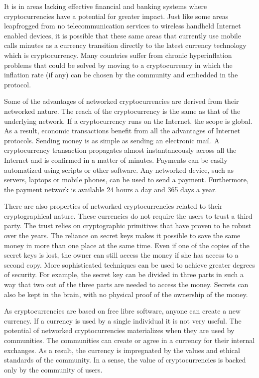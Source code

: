 \documentclass[journal]{IEEEtran}
\begin{document}
It is in areas lacking effective financial and banking systems where cryptocurrencies have a potential for greater impact.
Just like some areas leapfrogged from no telecommunication services to wireless handheld Internet enabled devices, it is possible that these same areas that currently use mobile calls minutes as a currency transition directly to the latest currency technology which is cryptocurrency.
Many countries suffer from chronic hyperinflation problems that could be solved by moving to a cryptocurrency in which the inflation rate (if any) can be chosen by the community and embedded in the protocol.

Some of the advantages of networked cryptocurrencies are derived from their networked nature.
The reach of the cryptocurrency is the same as that of the underlying network.
If a cryptocurrency runs on the Internet, the scope is global.
As a result, economic transactions benefit from all the advantages of Internet protocols.
Sending money is as simple as sending an electronic mail.
A cryptocurrency transaction propagates almost instantaneously across all the Internet and is confirmed in a matter of minutes.
Payments can be easily automatized using scripts or other software.
Any networked device, such as servers, laptops or mobile phones, can be used to send a payment.
Furthermore, the payment network is available 24 hours a day and 365 days a year.

There are also properties of networked cryptocurrencies related to their cryptographical nature.
These currencies do not require the users to trust a third party.
The trust relies on cryptographic primitives that have proven to be robust over the years.
The reliance on secret keys makes it possible to save the same money in more than one place at the same time.
Even if one of the copies of the secret keys is lost, the owner can still access the money if she has access to a second copy.
More sophisticated techniques can be used to achieve greater degrees of security. 
For example, the secret key can be divided in three parts in such a way that two out of the three parts are needed to access the money.
Secrets can also be kept in the brain, with no physical proof of the ownership of the money.

As cryptocurrencies are based on free libre software, anyone can create a new currency.
If a currency is used by a single individual it is not very useful.
The potential of networked cryptocurrencies materializes when they are used by communities.
The communities can create or agree in a currency for their internal exchanges.
As a result, the currency is impregnated by the values and ethical standards of the community.
In a sense, the value of cryptocurrencies is backed only by the community of users.
\end{document}
